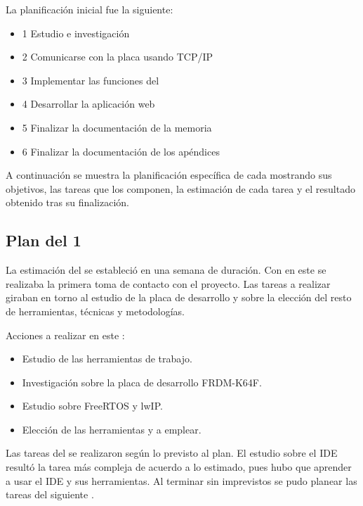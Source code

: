 La planificación inicial fue la siguiente:
\begin{itemize}
  \item {} 1 Estudio e investigación
  \item {} 2 Comunicarse con la placa usando TCP/IP 
  \item {} 3 Implementar las funciones del 
  \item {} 4 Desarrollar la aplicación web
  \item {} 5 Finalizar la documentación de la memoria
  \item {} 6 Finalizar la documentación de los apéndices
\end{itemize}

A continuación se muestra la planificación específica de cada
 mostrando sus objetivos, las tareas que los componen,
la estimación de cada tarea y el resultado obtenido tras su finalización.

\clearpage

\subsection{Plan del  1} \label{sec:plan-s1}
La estimación del  se estableció en una semana de
duración. Con en este  se realizaba la primera toma de
contacto con el proyecto. Las tareas a realizar giraban en torno al estudio de
la placa de desarrollo y sobre la elección del resto de herramientas, técnicas y
metodologías.

Acciones a realizar en este :
\begin{itemize}
  \item Estudio de las herramientas de trabajo.
  \item Investigación sobre la placa de desarrollo FRDM-K64F.
  \item Estudio sobre FreeRTOS y lwIP.
  \item Elección de las herramientas y  a emplear.    
\end{itemize}


Las tareas del  se realizaron según lo previsto al plan.
El estudio sobre el IDE resultó la tarea más compleja de acuerdo a lo estimado,
pues hubo que aprender a usar el IDE y sus herramientas. Al terminar sin
imprevistos se pudo planear las tareas del siguiente .

